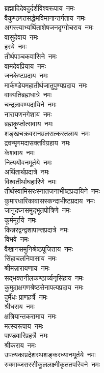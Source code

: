 \begin{multicols}{2}
\begin{flushleft}
ब्रह्मादिदेवदुर्दर्शविश्वरूपाय~नमः\\
वैकुण्ठगत\-सद्धेमविमानान्तर्गताय~नमः\\
अगस्त्याभ्यर्थिताशेष\-जनदृग्गोचराय~नमः\\
वासुदेवाय~नमः\hfill{}\\
हरये~नमः\\
तीर्थपञ्चकवासिने~नमः\\
वामदेवप्रियाय~नमः\\
जनकेष्टप्रदाय~नमः\\
मार्कण्डेयमहातीर्थ\-जातुपुण्यप्रदाय~नमः\\
वाक्पतिब्रह्मधात्रे~नमः\\
चन्द्रलावण्यदायिने~नमः\\
नारायणनगेशाय~नमः\\
ब्रह्मकॄप्तोत्सवाय~नमः\\
शङ्खचक्रवरानम्रलसत्कर\-तलाय~\mbox{नमः~\hfill~}\\
द्रवन्मृगमदासक्तविग्रहाय~नमः\\
केशवाय~नमः\\
नित्ययौवनमूर्तये~नमः\\
अर्थितार्थप्रदात्रे~नमः\\
विश्वतीर्थाघहारिणे~नमः\\
तीर्थस्वामिसरःस्नात\-जनाभीष्टप्रदायिने~नमः\\
कुमारधारिकावास\-स्कन्दाभीष्टप्रदाय~नमः\\
जानुदघ्नसमुद्भूतपोत्रिणे~नमः\\
कूर्ममूर्तये~नमः\\
किन्नरद्वन्द्वशापान्त\-प्रदात्रे~नमः\hfill{}\\
विभवे~नमः\\
वैखानसमुनिश्रेष्ठपूजिताय~नमः\\
सिंहाचलनिवासाय~नमः\\
श्रीमन्नारायणाय~नमः\\
सद्भक्तनीलकण्ठार्च्य\-नृसिंहाय~नमः\\
कुमुदाक्षगणश्रेष्ठसेनापत्य\-प्रदाय~नमः\\
दुर्मेधः प्राणहर्त्रे~नमः\\
श्रीधराय~नमः\\
क्षत्रियान्तकरामाय~नमः\\
मत्स्यरूपाय~नमः\hfill{}\\
पाण्डवारिप्रहर्त्रे~नमः\\
श्रीकराय~नमः\\
उपत्यकाप्रदेशस्थशङ्कर\-ध्यानमूर्तये~नमः\\
रुक्माब्जसरसीकूललक्ष्मीकृत\-तपस्विने~नमः\\

\end{flushleft}
\end{multicols}
